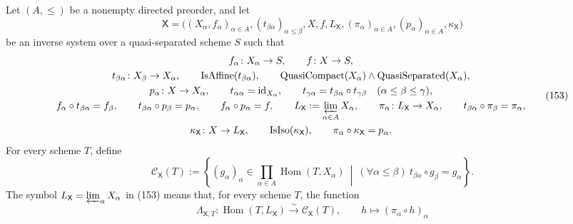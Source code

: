 \begin{definition}
  \label{def:nagata-fixed-base-separated-stage}
  \lean{}

  Let $(A,\leq)$ be a nonempty directed preorder, and let
  \[
    \mathsf X
      =\bigl((X_\alpha,f_\alpha)_{\alpha\in A},
        (t_{\beta\alpha})_{\alpha\leq\beta},
        X,f,L_{\mathsf X},(\pi_\alpha)_{\alpha\in A},
        (p_\alpha)_{\alpha\in A},\kappa_{\mathsf X}\bigr)         \tag{152}
  \]
  be an inverse system over a quasi-separated scheme $S$ such that
  \[
  \begin{gathered}
    f_\alpha\colon X_\alpha\to S,\qquad f\colon X\to S,\\
    t_{\beta\alpha}\colon X_\beta\to X_\alpha,\qquad
    \operatorname{IsAffine}(t_{\beta\alpha}),\qquad
    \operatorname{QuasiCompact}(X_\alpha)
      \wedge\operatorname{QuasiSeparated}(X_\alpha),\\
    p_\alpha\colon X\to X_\alpha,\qquad
    t_{\alpha\alpha}=\operatorname{id}_{X_\alpha},\qquad
    t_{\gamma\alpha}
      =t_{\beta\alpha}\circ t_{\gamma\beta}
      \quad(\alpha\leq\beta\leq\gamma),\\
    f_\alpha\circ t_{\beta\alpha}=f_\beta,\qquad
    t_{\beta\alpha}\circ p_\beta=p_\alpha,\qquad
    f_\alpha\circ p_\alpha=f,\qquad
    L_{\mathsf X}:=\varprojlim_{\alpha\in A}X_\alpha,\qquad
    \pi_\alpha\colon L_{\mathsf X}\to X_\alpha,\qquad
    t_{\beta\alpha}\circ\pi_\beta=\pi_\alpha,\\
    \kappa_{\mathsf X}\colon X\to L_{\mathsf X},\qquad
    \operatorname{IsIso}(\kappa_{\mathsf X}),\qquad
    \pi_\alpha\circ\kappa_{\mathsf X}=p_\alpha .
  \end{gathered}                                                 \tag{153}
  \]
  For every scheme \(T\), define
  \[
    \mathcal C_{\mathsf X}(T):=
      \left\{(g_\alpha)_\alpha\in
        \prod_{\alpha\in A}\operatorname{Hom}(T,X_\alpha)
      \ \middle|\
        (\forall\alpha\leq\beta)\
          t_{\beta\alpha}\circ g_\beta=g_\alpha\right\}.           \tag{153a}
  \]
  The symbol \(L_{\mathsf X}=\varprojlim_\alpha X_\alpha\) in (153) means
  that, for every scheme \(T\), the function
  \[
    \Lambda_{\mathsf X,T}\colon
      \operatorname{Hom}(T,L_{\mathsf X})
        \xrightarrow{\sim}\mathcal C_{\mathsf X}(T),\qquad
    h\longmapsto(\pi_\alpha\circ h)_\alpha                         \tag{153b}
\]
\end{definition}
